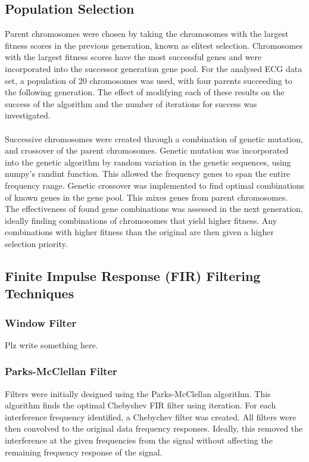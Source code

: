 \documentclass[a4paper, 11pt]{article}
\begin{document}
    \subsection{Population Selection}\label{sec:meth_sub3}
        Parent chromosomes were chosen by taking the chromosomes with the largest fitness scores in the previous generation,
        known as elitest selection. 
        Chromosomes with the largest fitness scores have the most successful genes and were incorporated into the
        successor generation gene pool. For the analysed ECG data set, a population of 20 chromosomes was used, with four
        parents succeeding to the following generation. The effect of modifying each of these results on the success of the
        algorithm and the number of iterations for success was investigated. 
        \\\\
        Successive chromosomes were created through a combination of genetic mutation, and crossover of the parent chromosomes.
        Genetic mutation was incorporated into the genetic algorithm by random variation in the genetic sequences, using numpy's 
        randint function. This allowed the frequency genes to span the entire frequency range. Genetic crossover was implemented
        to find optimal combinations of known genes in the gene pool. This mixes genes from parent chromosomes. The effectiveness of 
        found gene combinations was assessed in the next generation, ideally finding combinations of chromosomes that yield higher 
        fitness. Any combinations with higher fitness than the original are then given a higher selection priority. 

    \subsection{Finite Impulse Response (FIR) Filtering Techniques}\label{sec:meth_sub4}

        \subsubsection{Window Filter}
            Plz write something here.

        \subsubsection{Parks-McClellan Filter}
        Filters were initially designed using the Parks-McClellan algorithm. This algorithm finds the optimal Chebyshev FIR filter
        using iteration. For each interference frequency identified, a Chebychev filter was created. All filters were then convolved
        to the original data frequency responses. Ideally, this removed the interference at the given frequencies from the signal
        without affecting the remaining frequency response of the signal.
\end{document}
